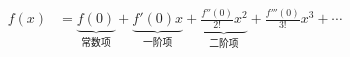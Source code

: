 \documentclass[preview]{standalone}
\begin{document}
\begin{align*}
f(x) &= \underbrace{f(0)}_{\text{常数项}} + \underbrace{f'(0)x}_{\text{一阶项}} + \underbrace{\frac{f''(0)}{2!}x^2}_{\text{二阶项}} + \frac{f'''(0)}{3!}x^3 + \cdots
\end{align*}
\end{document}
